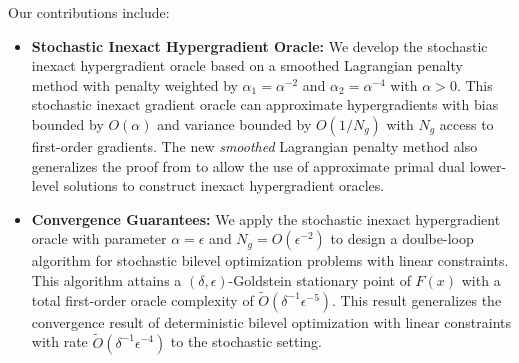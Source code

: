 \documentclass[letterpaper]{article} %
\newcommand{\1}{\mathbf{1}}
\begin{document}
Our contributions include:
\begin{itemize}[leftmargin=*]
    \item \textbf{Stochastic Inexact Hypergradient Oracle:} We develop the stochastic inexact hypergradient oracle based on a smoothed Lagrangian penalty method with penalty weighted by $\alpha_1 = \alpha^{-2}$ and $\alpha_2 = \alpha^{-4}$ with $\alpha > 0$.
    This stochastic inexact gradient oracle can approximate hypergradients with bias bounded by $O(\alpha)$ and variance bounded by $O(1/N_g)$ with $N_g$ access to first-order gradients. The new \textit{smoothed} Lagrangian penalty method also generalizes the proof from \cite{kornowski2024} to allow the use of approximate primal dual lower-level solutions to construct inexact hypergradient oracles.


    \item \textbf{Convergence Guarantees:} We apply the 
    stochastic inexact hypergradient oracle with parameter $\alpha = \epsilon$ and $N_g = O(\epsilon^{-2})$ to design a doulbe-loop algorithm for stochastic bilevel optimization problems with linear constraints. This algorithm attains a $(\delta, \epsilon)$-Goldstein stationary point of $F(x)$ with a total first-order oracle complexity of $\tilde{O}(\delta^{-1}\epsilon^{-5})$. This result generalizes the convergence result of deterministic bilevel optimization with linear constraints with rate $\tilde{O}(\delta^{-1} \epsilon^{-4})$ to the stochastic setting.  %



\end{itemize}
\end{document}
